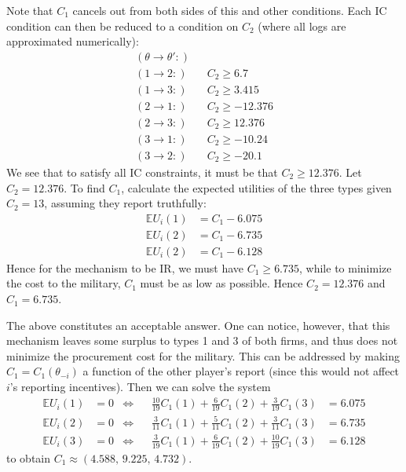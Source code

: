 \documentclass[a4paper]{article}
\begin{document}
Note that $C_1$ cancels out from both sides of this and other conditions.
Each IC condition can then be reduced to a condition on $C_2$ (where all logs are approximated numerically):
\begin{align*}
	(\theta \to \theta':)
	\\
	(1 \to 2:)\quad& C_2 \geq 6.7
	\\
	(1 \to 3:)\quad& C_2 \geq 3.415
	\\
	(2 \to 1:)\quad& C_2 \geq -12.376
	\\
	(2 \to 3:)\quad& C_2 \geq 12.376
	\\
	(3 \to 1:)\quad& C_2 \geq -10.24
	\\
	(3 \to 2:)\quad& C_2 \geq -20.1
\end{align*}
We see that to satisfy all IC constraints, it must be that $C_2 \geq 12.376$. Let $C_2 = 12.376$.
To find $C_1$, calculate the expected utilities of the three types given $C_2 = 13$, assuming they report truthfully:
\begin{align*}
	\mathbb{E} U_i(1) &= C_1 - 6.075
	\\
	\mathbb{E} U_i(2) &= C_1 - 6.735
	\\
	\mathbb{E} U_i(2) &= C_1 - 6.128
\end{align*}
Hence for the mechanism to be IR, we must have $C_1 \geq 6.735$, while to minimize the cost to the military, $C_1$ must be as low as possible. Hence $C_2 = 12.376$ and $C_1 = 6.735$.

The above constitutes an acceptable answer. One can notice, however, that this mechanism leaves some surplus to types 1 and 3 of both firms, and thus does not minimize the procurement cost for the military. This can be addressed by making $C_1 = C_1(\theta_{-i})$ a function of the other player's report (since this would not affect $i$'s reporting incentives). Then we can solve the system 
\begin{align*}
	\mathbb{E} U_i(1) &= 0 &\iff&&
	\frac{10}{19} C_1(1) + \frac{6}{19} C_1(2) + \frac{3}{19} C_1(3) &= 6.075
	\\
	\mathbb{E} U_i(2) &= 0 &\iff&&
	\frac{3}{11} C_1(1) + \frac{5}{11} C_1(2) + \frac{3}{11} C_1(3) &= 6.735
	\\
	\mathbb{E} U_i(3) &= 0 &\iff&&
	\frac{3}{19} C_1(1) + \frac{6}{19} C_1(2) + \frac{10}{19} C_1(3) &= 6.128
\end{align*}
to obtain $C_1 \approx (4.588,\, 9.225,\, 4.732)$.
\fi 
\end{document}
